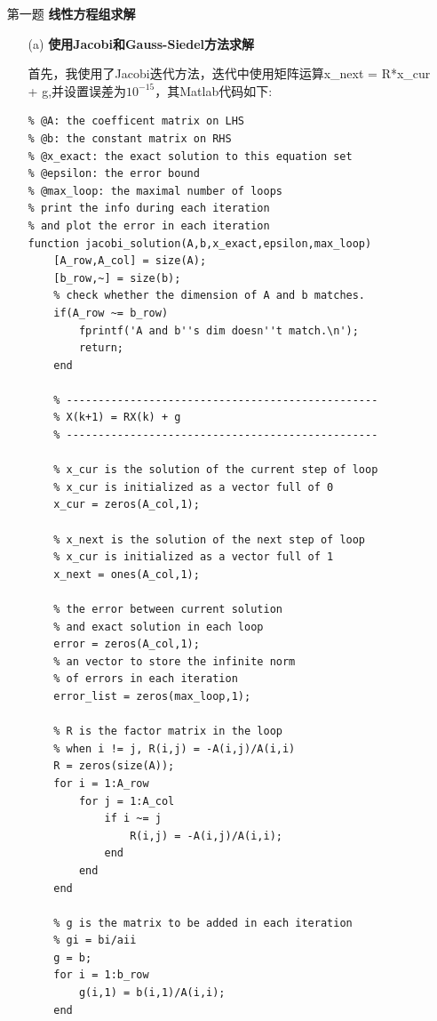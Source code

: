 \documentclass[12pt,a4paper,utf8]{ctexart}
\begin{document}
\begin{enumerate}
\item[第一题] \textbf{线性方程组求解}

    \begin{itemize}
    \item [(a)] \textbf{使用Jacobi和Gauss-Siedel方法求解}
    \par
    首先，我使用了Jacobi迭代方法，迭代中使用矩阵运算x\_next = R*x\_cur + g,并设置误差为$10^{-15}$，其Matlab代码如下:
\begin{lstlisting}[frame=single]
% implementing jacobi iteration
% @A: the coefficent matrix on LHS
% @b: the constant matrix on RHS
% @x_exact: the exact solution to this equation set
% @epsilon: the error bound
% @max_loop: the maximal number of loops
% print the info during each iteration
% and plot the error in each iteration
function jacobi_solution(A,b,x_exact,epsilon,max_loop)
    [A_row,A_col] = size(A);
    [b_row,~] = size(b);
    % check whether the dimension of A and b matches.
    if(A_row ~= b_row)
        fprintf('A and b''s dim doesn''t match.\n');
        return;
    end
    
    % -------------------------------------------------
    % X(k+1) = RX(k) + g
    % -------------------------------------------------
    
    % x_cur is the solution of the current step of loop
    % x_cur is initialized as a vector full of 0
    x_cur = zeros(A_col,1);
    
    % x_next is the solution of the next step of loop
    % x_cur is initialized as a vector full of 1
    x_next = ones(A_col,1);
    
    % the error between current solution 
    % and exact solution in each loop
    error = zeros(A_col,1);
    % an vector to store the infinite norm 
    % of errors in each iteration
    error_list = zeros(max_loop,1);
    
    % R is the factor matrix in the loop
    % when i != j, R(i,j) = -A(i,j)/A(i,i)
    R = zeros(size(A));
    for i = 1:A_row
        for j = 1:A_col
            if i ~= j
                R(i,j) = -A(i,j)/A(i,i);
            end
        end
    end
    
    % g is the matrix to be added in each iteration
    % gi = bi/aii
    g = b;
    for i = 1:b_row
        g(i,1) = b(i,1)/A(i,i);
    end
    

\end{lstlisting}
\end{itemize}
\end{enumerate}
\end{document}
